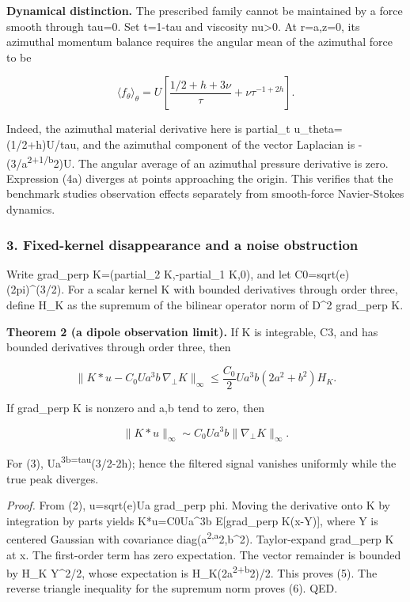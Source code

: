 \documentclass[
]{article}
\begin{document}
\textbf{Dynamical distinction.} The prescribed family cannot be
maintained by a force smooth through tau=0. Set t=1-tau and viscosity
nu\textgreater0. At r=a,z=0, its azimuthal momentum balance requires the
angular mean of the azimuthal force to be

\[
\langle f_\theta\rangle_\theta
=U\left[\frac{1/2+h+3\nu}{\tau}+\nu\tau^{-1+2h}\right]. \tag{4a}
\]

Indeed, the azimuthal material derivative here is partial\_t
u\_theta=(1/2+h)U/tau, and the azimuthal component of the vector
Laplacian is -(3/a\textsuperscript{2+1/b}2)U. The angular average of an
azimuthal pressure derivative is zero. Expression (4a) diverges at
points approaching the origin. This verifies that the benchmark studies
observation effects separately from smooth-force Navier-Stokes dynamics.

\hypertarget{fixed-kernel-disappearance-and-a-noise-obstruction}{%
\subsubsection{3. Fixed-kernel disappearance and a noise
obstruction}\label{fixed-kernel-disappearance-and-a-noise-obstruction}}

Write grad\_perp K=(partial\_2 K,-partial\_1 K,0), and let
C0=sqrt(e)(2pi)\^{}(3/2). For a scalar kernel K with bounded derivatives
through order three, define H\_K as the supremum of the bilinear
operator norm of D\^{}2 grad\_perp K.

\textbf{Theorem 2 (a dipole observation limit).} If K is integrable, C3,
and has bounded derivatives through order three, then

\[
\|K*u-C_0Ua^3b\,\nabla_\perp K\|_\infty
\leq \frac{C_0}{2}Ua^3b(2a^2+b^2)H_K. \tag{5}
\]

If grad\_perp K is nonzero and a,b tend to zero, then

\[
\|K*u\|_\infty\sim C_0Ua^3b\|\nabla_\perp K\|_\infty. \tag{6}
\]

For (3), Ua\textsuperscript{3b=tau}(3/2-2h); hence the filtered signal
vanishes uniformly while the true peak diverges.

\emph{Proof.} From (2), u=sqrt(e)Ua grad\_perp phi. Moving the
derivative onto K by integration by parts yields K*u=C0Ua\^{}3b
E{[}grad\_perp K(x-Y){]}, where Y is centered Gaussian with covariance
diag(a\textsuperscript{2,a}2,b\^{}2). Taylor-expand grad\_perp K at x.
The first-order term has zero expectation. The vector remainder is
bounded by H\_K \textbar Y\textbar\^{}2/2, whose expectation is
H\_K(2a\textsuperscript{2+b}2)/2. This proves (5). The reverse triangle
inequality for the supremum norm proves (6). QED.
\end{document}
